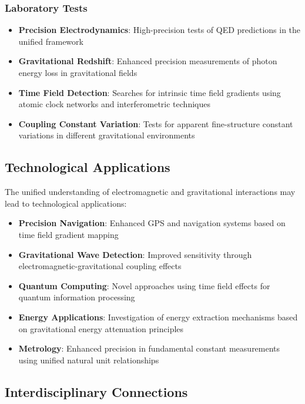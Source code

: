 \documentclass[12pt,a4paper]{article}
\begin{document}
	\subsubsection{Laboratory Tests}
	\label{subsubsec:laboratory_tests}
	
	\begin{itemize}
		\item \textbf{Precision Electrodynamics}: High-precision tests of QED predictions in the unified framework \cite{pascher_muon_g2_2025}
		\item \textbf{Gravitational Redshift}: Enhanced precision measurements of photon energy loss in gravitational fields \cite{Pound1960,Ludlow2015}
		\item \textbf{Time Field Detection}: Searches for intrinsic time field gradients using atomic clock networks and interferometric techniques
		\item \textbf{Coupling Constant Variation}: Tests for apparent fine-structure constant variations in different gravitational environments \cite{Webb2001}
	\end{itemize}
	
	\subsection{Technological Applications}
	\label{subsec:technological_applications}
	
	The unified understanding of electromagnetic and gravitational interactions may lead to technological applications:
	
	\begin{itemize}
		\item \textbf{Precision Navigation}: Enhanced GPS and navigation systems based on time field gradient mapping \cite{Ashby2003}
		\item \textbf{Gravitational Wave Detection}: Improved sensitivity through electromagnetic-gravitational coupling effects
		\item \textbf{Quantum Computing}: Novel approaches using time field effects for quantum information processing
		\item \textbf{Energy Applications}: Investigation of energy extraction mechanisms based on gravitational energy attenuation principles
		\item \textbf{Metrology}: Enhanced precision in fundamental constant measurements using unified natural unit relationships
	\end{itemize}
	
	\subsection{Interdisciplinary Connections}
	\label{subsec:interdisciplinary_connections}
	
\end{document}
